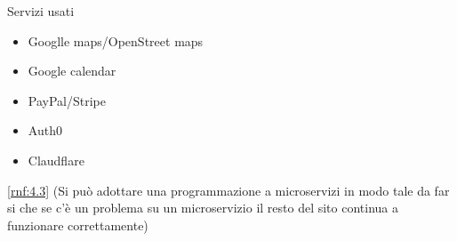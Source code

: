 \documentclass{article}
\begin{document}

\pagebreak

\tableofcontents
\pagebreak










Servizi usati
\begin{itemize}
    \item Googlle maps/OpenStreet maps
    \item Google calendar
    \item PayPal/Stripe
    \item Auth0
    \item Claudflare
\end{itemize}

\ref{rnf:4.3} (Si può adottare una programmazione a microservizi in modo tale da far si che se c'è un problema su un microservizio il resto del sito continua a funzionare correttamente)
\end{document}
